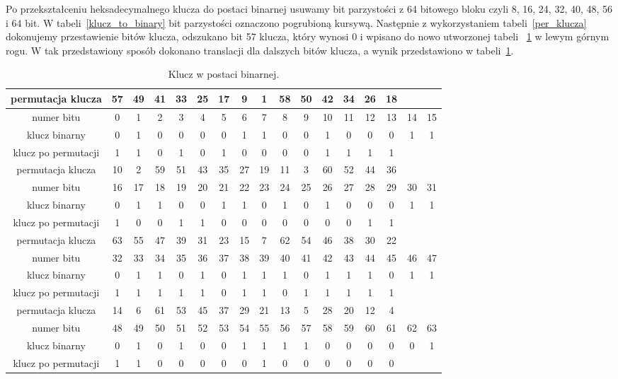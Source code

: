 \documentclass[12p]{article}
\begin{document}
Po przekształceniu heksadecymalnego klucza do postaci binarnej usuwamy bit parzystości z 64 bitowego bloku czyli 8, 16, 24, 32, 40, 48, 56 i 64 bit. W tabeli~\ref{klucz_to_binary} bit parzystości oznaczono pogrubioną kursywą. Następnie z wykorzystaniem tabeli~\ref{per_klucza} dokonujemy przestawienie bitów klucza, odszukano bit 57 klucza, który wynosi 0 i wpisano do nowo utworzonej tabeli ~\ref{tabela_podstawienia} w lewym górnym rogu. W tak przedstawiony sposób dokonano translacji dla dalszych bitów klucza, a wynik przedstawiono w tabeli~\ref{tabela_podstawienia}.

\begin{table}[H]
\centering
\begin{tabular}{|c|c|c|c|c|c|c|c|c|c|c|c|c|c|c|c|c|}
\hline
permutacja klucza & 57 & 49 & 41 & 33 & 25 & 17 & 9 & 1 & 58 & 50 & 42 & 34 & 26 & 18 & &\\
\hline
numer bitu & 0 & 1 & 2 & 3 & 4 & 5 & 6 & 7 & 8 & 9 & 10 & 11 & 12 & 13 & 14 & 15\\
\hline
klucz binarny & 0 & 1 & 0 & 0 & 0 & 0 & 1 & 1 & 0 & 0 & 1 & 0 & 0 & 0 & 1 & 1\\
\hline
klucz po permutacji & 1 & 1 & 0 & 1 & 0 & 1 & 0 & 0 & 0 & 0 & 1 & 1 & 1 & 1 &&\\

\hline
\hline
permutacja klucza & 10 & 2 & 59 & 51 & 43 & 35 & 27 & 19 & 11 & 3 & 60 & 52 & 44 & 36 &&\\
\hline
numer bitu & 16 & 17 & 18 & 19 & 20 & 21 & 22 & 23 & 24 & 25 & 26 & 27 & 28 & 29 & 30 & 31\\
\hline
klucz binarny & 0 & 1 & 1 & 0 & 0 & 1 & 1 & 0 & 1 & 0 & 1 & 0 & 0 & 0 & 1 & 1\\
\hline 
klucz po permutacji & 1 & 0 & 0 & 1 & 1 & 0 & 0 & 0 & 0 & 0 & 0 & 0 & 1 & 1 &&\\

\hline
\hline
permutacja klucza & 63 & 55 & 47 & 39 & 31 & 23 & 15 & 7 & 62 & 54 & 46 & 38 & 30 & 22 &&\\
\hline
numer bitu & 32 & 33 & 34 & 35 & 36 & 37 & 38 & 39 & 40 & 41 & 42 & 43 & 44 & 45 & 46 & 47 \\
\hline
klucz binarny & 0 & 1 & 1 & 0 & 1 & 0 & 1 & 1 & 1 & 0 & 1 & 1 & 1 & 0 & 1 & 1 \\
\hline
klucz po permutacji & 1 & 1 & 1 & 1 & 1 & 0 & 1 & 1 & 0 & 1 & 1 & 1 & 1 & 1 &&\\

\hline
\hline
permutacja klucza & 14 & 6 & 61 & 53 & 45 & 37 & 29 & 21 & 13 & 5 & 28 & 20 & 12 & 4 &&\\
\hline
numer bitu & 48 & 49 & 50 & 51 & 52 & 53 & 54 & 55 & 56 & 57 & 58 & 59 & 60 & 61 & 62 & 63\\
\hline
klucz binarny & 0 & 1 & 0 & 1 & 0 & 0 & 1 & 1 & 1 & 1 & 0 & 0 & 0 & 0 & 0 & 1\\
\hline 
klucz po permutacji & 1 & 1 & 0 & 0 & 0 & 0 & 0 & 1 & 0 & 0 & 0 & 0 & 0 & 0 &&\\
\hline
\end{tabular}
\caption{Klucz w postaci binarnej.}~\label{tabela_podstawienia}
\end{table}
\end{document}
